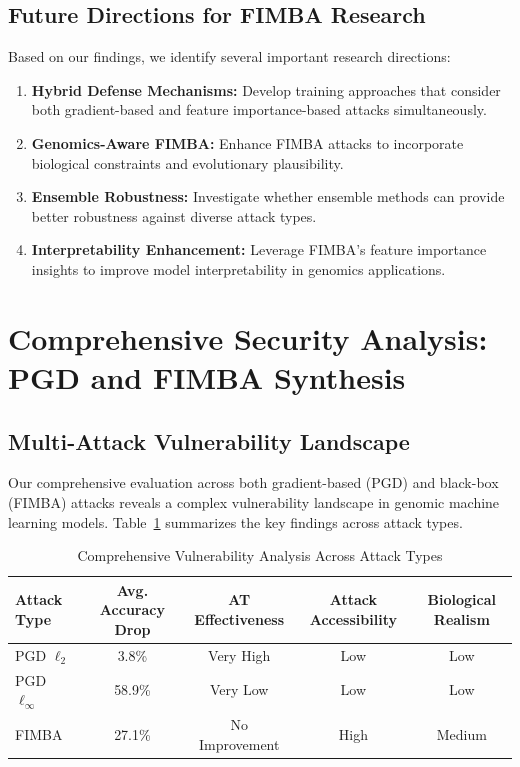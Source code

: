 \documentclass{article} %
\begin{document}
\subsection{Future Directions for FIMBA Research}

Based on our findings, we identify several important research directions:

\begin{enumerate}
    \item \textbf{Hybrid Defense Mechanisms:} Develop training approaches that consider both gradient-based and feature importance-based attacks simultaneously.
    
    \item \textbf{Genomics-Aware FIMBA:} Enhance FIMBA attacks to incorporate biological constraints and evolutionary plausibility.
    
    \item \textbf{Ensemble Robustness:} Investigate whether ensemble methods can provide better robustness against diverse attack types.
    
    \item \textbf{Interpretability Enhancement:} Leverage FIMBA's feature importance insights to improve model interpretability in genomics applications.
\end{enumerate}

\section{Comprehensive Security Analysis: PGD and FIMBA Synthesis}

\subsection{Multi-Attack Vulnerability Landscape}

Our comprehensive evaluation across both gradient-based (PGD) and black-box (FIMBA) attacks reveals a complex vulnerability landscape in genomic machine learning models. Table~\ref{tab:comprehensive_vulnerability} summarizes the key findings across attack types.

\begin{table}[h]
\centering
\caption{Comprehensive Vulnerability Analysis Across Attack Types}
\label{tab:comprehensive_vulnerability}
\begin{tabular}{lcccc}
\toprule
\textbf{Attack Type} & \textbf{Avg. Accuracy Drop} & \textbf{AT Effectiveness} & \textbf{Attack Accessibility} & \textbf{Biological Realism} \\
\midrule
PGD $\ell_2$ & 3.8\% & Very High & Low & Low \\
PGD $\ell_\infty$ & 58.9\% & Very Low & Low & Low \\
FIMBA & 27.1\% & No Improvement & High & Medium \\
\bottomrule
\end{tabular}
\end{table}
\end{document}
